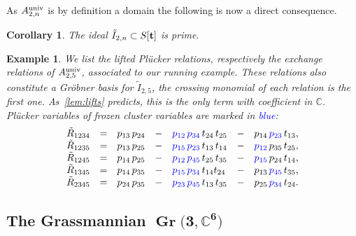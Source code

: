 \documentclass[10pt,a4paper]{amsart}
\newcommand{\thlabel}[1]{\label{#1}}
\newcommand{\thref}[1]{\ref{#1}}
\newtheorem{Corollary}[Theorem]{Corollary}
\newtheorem{Example}[Theorem]{Example}
\numberwithin{equation}{section}
\DeclareMathOperator{\Gr}{Gr}
\begin{document}
As $A_{2,n}^{\rm univ}$ is by definition a domain the following is now a direct consequence.

\begin{Corollary}\thlabel{prop:I2n prime}
The ideal $\tilde I_{2,n}\subset S[{\bf t}]$ is prime.
\end{Corollary}



\begin{Example}
We list the lifted Pl\"ucker relations, respectively the exchange relations of $A_{2,5}^{\rm univ}$, associated to our running example. These relations also constitute a Gr\"obner basis for $\tilde I_{2,5}$, the crossing monomial of each relation is the first one. As~\thref{lem:lifts} predicts, this is the only term with coefficient in $\mathbb C$. Pl\"ucker variables of frozen cluster variables are marked in \textcolor{blue}{blue}:
\begin{displaymath}
\begin{matrix*}[l]
\tilde R_{1234} & = & p_{13}\,p_{24} & - & \textcolor{blue}{p_{12}\,p_{34}}\, t_{24}\,t_{25} & - & p_{14}\,\textcolor{blue}{p_{23}}\,t_{13}, \\
\tilde R_{1235} & = & p_{13}\,p_{25} & - & \textcolor{blue}{p_{15}\,p_{23}} \,t_{13}\, t_{14} & - & \textcolor{blue}{p_{12}}\,p_{35}\,t_{25}, \\
\tilde R_{1245} & = & p_{14}\,p_{25} & - & \textcolor{blue}{p_{12}\,p_{45}}\, t_{25}\, t_{35} & - & \textcolor{blue}{p_{15}}\,p_{24} \,t_{14}, \\
\tilde R_{1345} & = & p_{14}\,p_{35} & - & \textcolor{blue}{p_{15}\,p_{34}}\, t_{14}t_{24} & - & p_{13}\,\textcolor{blue}{p_{45}}\, t_{35}, \\
\tilde R_{2345} & = & p_{24}\,p_{35} & - & \textcolor{blue}{p_{23}\,p_{45}} \,t_{13}\,t_{35} & - & p_{25}\,\textcolor{blue}{p_{34}}\, t_{24}.
\end{matrix*}
\end{displaymath}
\end{Example}



\subsection[The Grassmannian of 3-planes in 6-space]
{The Grassmannian $\boldsymbol{\Gr\big(3,\mathbb C^6\big)}$}\label{sec:Gr(3,6)}
\end{document}
